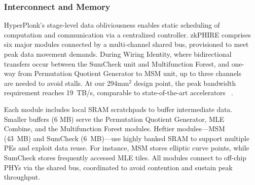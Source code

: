 

\subsubsection{\textbf{Interconnect and Memory}}
HyperPlonk’s stage-level data obliviousness enables static scheduling of computation and communication via a centralized controller. 
zkPHIRE comprises six major modules connected by a multi-channel shared bus, provisioned to meet peak data movement demands. 
During Wiring Identity, where bidirectional transfers occur between the 
SumCheck unit and Multifunction Forest, and one-way from Permutation Quotient Generator to MSM unit, up to three channels are needed to avoid stalls.
At our 294mm$^2$ design point, the peak bandwidth requirement reaches 19~TB/s, comparable to state-of-the-art accelerators ~\cite{samardzic2021_F1, kim2022_BTS}.

Each module includes local SRAM scratchpads to buffer intermediate data. Smaller buffers (6 MB) serve the Permutation Quotient Generator, MLE Combine, and the Multifunction Forest modules. Heftier modules—MSM (43~MB) and SumCheck (6~MB)—use highly banked SRAM to support multiple PEs and exploit data reuse. For instance, MSM stores elliptic curve points, while SumCheck stores frequently accessed MLE tiles. All modules connect to off-chip PHYs via the shared bus, coordinated to avoid contention and sustain peak throughput.


